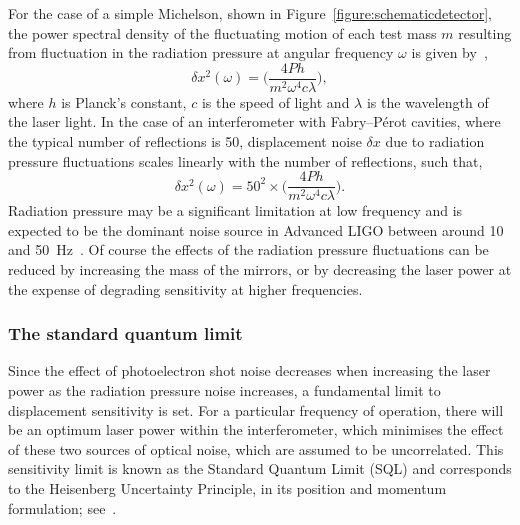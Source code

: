 For the case of a simple Michelson, shown in
Figure~\ref{figure:schematicdetector}, the power spectral density of the
fluctuating motion of each test mass $m$ resulting from fluctuation in the
radiation pressure at angular frequency $\omega$ is given
by~\cite{Edelstein},
\begin{equation}
\delta x^2(\omega) = \biggl(\frac{4 P h}{m^2 \omega^4 c
\lambda}\biggr),
 \label{equ:radiation-pressure1}
\end{equation}
where $h$ is Planck's constant, $c$ is the speed of light and $\lambda$ is the
wavelength of the laser light. In the case of an interferometer with Fabry--P\'{e}rot
cavities, where the typical number of reflections is 50, displacement noise
$\delta x$ due to radiation pressure fluctuations scales linearly with the
number of reflections, such that,
\begin{equation}
\delta x^2(\omega) = 50^2 \times \biggl(\frac{4 P h}{m^2 \omega^4
c \lambda}\biggr).
 \label{equ:radiation-pressure2}
\end{equation}
Radiation pressure may be a significant limitation at low frequency and is
expected to be the dominant noise source in Advanced LIGO between around 10 and
50~Hz~\cite{Harry:2010}. Of course the effects of the radiation pressure
fluctuations can be reduced by increasing the mass of the mirrors, or by
decreasing the laser power at the expense of degrading sensitivity at higher
frequencies.


\subsubsection{The standard quantum limit}
\label{subsubsection:SQL} 

Since the effect of photoelectron shot noise decreases when increasing the laser
power as the radiation pressure noise increases, a fundamental limit to
displacement sensitivity is set. For a particular frequency of operation, there
will be an optimum laser power within the interferometer, which minimises the
effect of these two sources of optical noise, which are assumed to be
uncorrelated. This sensitivity limit is known as the Standard Quantum Limit
(SQL) and corresponds to the Heisenberg Uncertainty Principle, in its position
and momentum formulation; see~\cite{Edelstein, Caves1, Caves2, Loudon:1981}.



